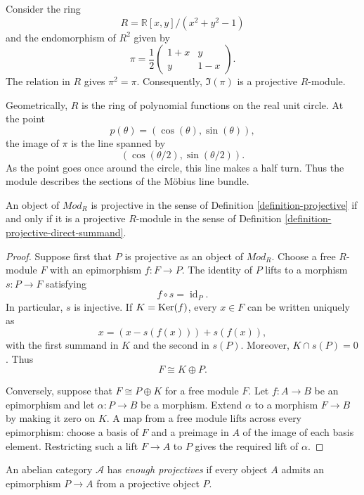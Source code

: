 \begin{example}
\label{example-moebius-projective}
Consider the ring
$$
R=
\mathbb{R}[x,y]/(x^2+y^2-1)
$$
and the endomorphism of $R^2$ given by
$$
\pi
=
\frac{1}{2}
\begin{pmatrix}
1+x & y \\
y & 1-x
\end{pmatrix}.
$$
The relation in $R$ gives $\pi^2=\pi$.
Consequently, $\Im(\pi)$ is a projective
$R$-module.

Geometrically, $R$ is the ring of
polynomial functions on the real unit
circle. At the point
$$
p(\theta)
=
(\cos(\theta),\sin(\theta)),
$$
the image of $\pi$ is the line spanned by
$$
(\cos(\theta/2),\sin(\theta/2)).
$$
As the point goes once around the circle,
this line makes a half turn. Thus the
module describes the sections of the
Möbius line bundle.
\end{example}

\begin{lemma}
\label{lemma-projective-module-object}
An object of $\mathit{Mod}_R$ is projective
in the sense of Definition
\ref{definition-projective} if and only if
it is a projective $R$-module in the sense
of Definition
\ref{definition-projective-direct-summand}.
\end{lemma}

\begin{proof}
Suppose first that $P$ is projective as an
object of $\mathit{Mod}_R$. Choose a free
$R$-module $F$ with an epimorphism
$f:F\to P$. The identity of $P$ lifts to
a morphism $s:P\to F$ satisfying
$$
f\circ s=\operatorname{id}_P.
$$
In particular, $s$ is injective. If
$K=\mathop{\mathrm{Ker}}(f)$, every $x\in F$ can be written
uniquely as
$$
x=(x-s(f(x)))+s(f(x)),
$$
with the first summand in $K$ and the
second in $s(P)$. Moreover,
$K\cap s(P)=0$. Thus
$$
F\cong K\oplus P.
$$

Conversely, suppose that
$F\cong P\oplus K$ for a free module $F$.
Let $f:A\to B$ be an epimorphism and let
$\alpha:P\to B$ be a morphism. Extend
$\alpha$ to a morphism $F\to B$ by making
it zero on $K$. A map from a free module
lifts across every epimorphism: choose a
basis of $F$ and a preimage in $A$ of the
image of each basis element. Restricting
such a lift $F\to A$ to $P$ gives the
required lift of $\alpha$.
\end{proof}

\begin{definition}
\label{definition-enough-projectives}
An abelian category $\mathcal{A}$ has
{\it enough projectives} if every object
$A$ admits an epimorphism $P\to A$ from a
projective object $P$.
\end{definition}

